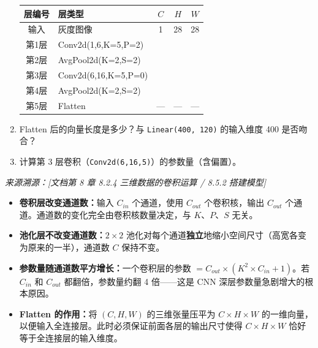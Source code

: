 \documentclass[a4paper,11pt]{ctexart}
\begin{document}
\begin{problembox}
\begin{enumerate}[(1)]
        \begin{center}
        \begin{tabular}{clccc}
            \toprule
            层编号 & 层类型 & $C$ & $H$ & $W$ \\
            \midrule
            输入 & 灰度图像 & 1 & 28 & 28 \\
            第1层 & Conv2d(1,6,K=5,P=2) & \underline{\quad} & \underline{\quad} & \underline{\quad} \\
            第2层 & AvgPool2d(K=2,S=2) & \underline{\quad} & \underline{\quad} & \underline{\quad} \\
            第3层 & Conv2d(6,16,K=5,P=0) & \underline{\quad} & \underline{\quad} & \underline{\quad} \\
            第4层 & AvgPool2d(K=2,S=2) & \underline{\quad} & \underline{\quad} & \underline{\quad} \\
            第5层 & Flatten & — & — & — \\
            \bottomrule
        \end{tabular}
        \end{center}

        \item Flatten 后的向量长度是多少？与 \texttt{Linear(400, 120)} 的输入维度 400 是否吻合？
        \item 计算第 3 层卷积（\texttt{Conv2d(6,16,5)}）的参数量（含偏置）。
    \end{enumerate}

    \vspace{0.2cm}
    {\color{gray}\small\textit{来源溯源：[文档第 8 章 8.2.4 三维数据的卷积运算 / 8.5.2 搭建模型]}}
\end{problembox}

\begin{beginnerbox}
    \begin{itemize}
        \item \textbf{卷积层改变通道数：}输入 $C_{in}$ 个通道，使用 $C_{out}$ 个卷积核，输出 $C_{out}$ 个通道。通道数的变化完全由卷积核数量决定，与 $K$、$P$、$S$ 无关。
        \item \textbf{池化层不改变通道数：}$2\times2$ 池化对每个通道\textbf{独立}地缩小空间尺寸（高宽各变为原来的一半），通道数 $C$ 保持不变。
        \item \textbf{参数量随通道数平方增长：}一个卷积层的参数 $= C_{out} \times (K^2 \times C_{in} + 1)$。若 $C_{in}$ 和 $C_{out}$ 都翻倍，参数量约翻 4 倍——这是 CNN 深层参数量急剧增大的根本原因。
        \item \textbf{Flatten 的作用：}将 $(C, H, W)$ 的三维张量压平为 $C \times H \times W$ 的一维向量，以便输入全连接层。此时必须保证前面各层的输出尺寸使得 $C \times H \times W$ 恰好等于全连接层的输入维度。
    \end{itemize}
\end{beginnerbox}
\end{document}
